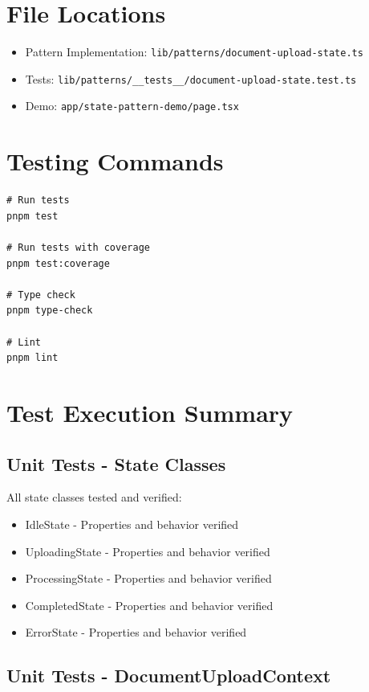 \documentclass[11pt,a4paper]{article}
\begin{document}
\section{File Locations}

\begin{itemize}
    \item Pattern Implementation: \texttt{lib/patterns/document-upload-state.ts}
    \item Tests: \texttt{lib/patterns/\_\_tests\_\_/document-upload-state.test.ts}
    \item Demo: \texttt{app/state-pattern-demo/page.tsx}
\end{itemize}

\section{Testing Commands}

\begin{verbatim}
# Run tests
pnpm test

# Run tests with coverage
pnpm test:coverage

# Type check
pnpm type-check

# Lint
pnpm lint
\end{verbatim}

\section{Test Execution Summary}

\subsection{Unit Tests - State Classes}

All state classes tested and verified:
\begin{itemize}
    \item IdleState - Properties and behavior verified
    \item UploadingState - Properties and behavior verified
    \item ProcessingState - Properties and behavior verified
    \item CompletedState - Properties and behavior verified
    \item ErrorState - Properties and behavior verified
\end{itemize}

\subsection{Unit Tests - DocumentUploadContext}
\end{document}
